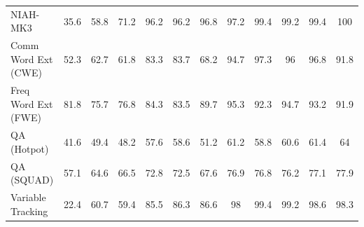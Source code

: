 \begin{table}[t]
\begin{tabular}{l|ccccc|ccccc|c}
NIAH-MK3 & \cellcolor{myred!90} 35.6 & \cellcolor{myred!58} 58.8 & \cellcolor{myred!40} 71.2 & \cellcolor{myred!5} 96.2 & \cellcolor{myred!5} 96.2 & \cellcolor{myred!4} 96.8 & \cellcolor{myred!4} 97.2 & \cellcolor{myred!1} 99.4 & \cellcolor{myred!1} 99.2 & \cellcolor{myred!1} 99.4 & 100 \\
Comm Word Ext (CWE) & \cellcolor{myred!90} 52.3 & \cellcolor{myred!66} 62.7 & \cellcolor{myred!68} 61.8 & \cellcolor{myred!19} 83.3 & \cellcolor{myred!18} 83.7 & \cellcolor{myred!54} 68.2 & \cellcolor{royalblue!7} 94.7 & \cellcolor{royalblue!13} 97.3 & \cellcolor{royalblue!10} 96 & \cellcolor{royalblue!11} 96.8 & 91.8 \\
Freq Word Ext (FWE) & \cellcolor{myred!56} 81.8 & \cellcolor{myred!90} 75.7 & \cellcolor{myred!84} 76.8 & \cellcolor{myred!42} 84.3 & \cellcolor{myred!46} 83.5 & \cellcolor{myred!12} 89.7 & \cellcolor{royalblue!19} 95.3 & \cellcolor{royalblue!2} 92.3 & \cellcolor{royalblue!16} 94.7 & \cellcolor{royalblue!7} 93.2 & 91.9 \\
QA (Hotpot) & \cellcolor{myred!90} 41.6 & \cellcolor{myred!59} 49.4 & \cellcolor{myred!63} 48.2 & \cellcolor{myred!26} 57.6 & \cellcolor{myred!22} 58.6 & \cellcolor{myred!51} 51.2 & \cellcolor{myred!11} 61.2 & \cellcolor{myred!21} 58.8 & \cellcolor{myred!14} 60.6 & \cellcolor{myred!10} 61.4 & 64 \\
QA (SQUAD) & \cellcolor{myred!90} 57.1 & \cellcolor{myred!57} 64.6 & \cellcolor{myred!49} 66.5 & \cellcolor{myred!22} 72.8 & \cellcolor{myred!23} 72.5 & \cellcolor{myred!45} 67.6 & \cellcolor{myred!4} 76.9 & \cellcolor{myred!5} 76.8 & \cellcolor{myred!7} 76.2 & \cellcolor{myred!3} 77.1 & 77.9 \\
Variable Tracking & \cellcolor{myred!90} 22.4 & \cellcolor{myred!45} 60.7 & \cellcolor{myred!46} 59.4 & \cellcolor{myred!15} 85.5 & \cellcolor{myred!14} 86.3 & \cellcolor{myred!14} 86.6 & 98 & \cellcolor{royalblue!1} 99.4 & \cellcolor{royalblue!1} 99.2 & 98.6 & 98.3 \\

\end{tabular}
\end{table}
